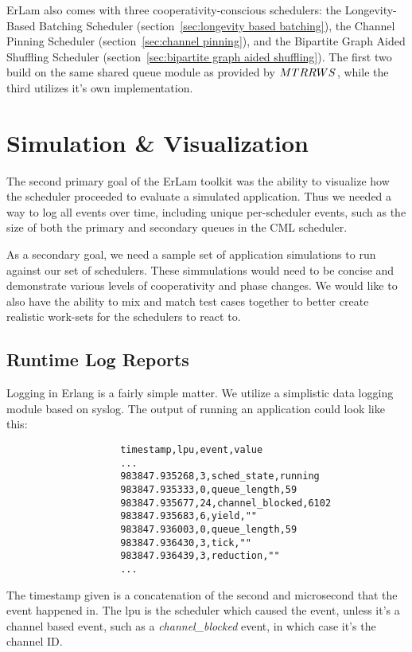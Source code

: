 ErLam also comes with three cooperativity-conscious schedulers: the 
Longevity-Based Batching Scheduler (section~\ref{sec:longevity based batching}),
the Channel Pinning Scheduler (section~\ref{sec:channel pinning}), and the
Bipartite Graph Aided Shuffling Scheduler (section~\ref{sec:bipartite graph aided shuffling}).
The first two build on the same shared queue module as provided by $MTRRWS^{\*}$, 
while the third utilizes it's own implementation.

\section{Simulation \& Visualization}\label{sec:simulation and visualization}

The second primary goal of the ErLam toolkit was the ability to visualize 
how the scheduler proceeded to evaluate a simulated application. Thus we needed
a way to log all events over time, including unique per-scheduler events, such 
as the size of both the primary and secondary queues in the CML scheduler.

As a secondary goal, we need a sample set of application simulations to run 
against our set of schedulers. These simmulations would need to be concise and
demonstrate various levels of cooperativity and phase changes. We would like
to also have the ability to mix and match test cases together to better create
realistic work-sets for the schedulers to react to.

\subsection{Runtime Log Reports}\label{sec:runtime log reports}

Logging in Erlang is a fairly simple matter. We utilize a simplistic data 
logging module based on syslog. The output of running an application 
could look like this:
{\footnotesize
\begin{verbatim}
                    timestamp,lpu,event,value
                    ...
                    983847.935268,3,sched_state,running
                    983847.935333,0,queue_length,59
                    983847.935677,24,channel_blocked,6102
                    983847.935683,6,yield,""
                    983847.936003,0,queue_length,59
                    983847.936430,3,tick,""
                    983847.936439,3,reduction,""
                    ...
\end{verbatim}
}
\noindent
The timestamp given is a concatenation of the second and microsecond that the
event happened in. The lpu is the scheduler which caused the event, unless it's
a channel based event, such as a \emph{channel\_blocked} event, in which case it's
the channel ID. 

